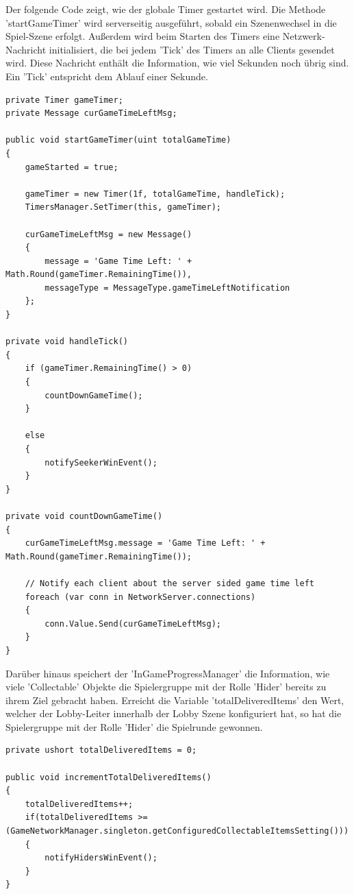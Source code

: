 Der folgende Code zeigt, wie der globale Timer gestartet wird. Die Methode 'startGameTimer' wird serverseitig ausgeführt, sobald ein Szenenwechsel in die Spiel-Szene erfolgt. Außerdem wird beim Starten des Timers eine Netzwerk-Nachricht initialisiert, die bei jedem 'Tick' des Timers an alle Clients gesendet wird. Diese Nachricht enthält die Information, wie viel Sekunden noch übrig sind. Ein 'Tick' entspricht dem Ablauf einer Sekunde.

\begin{lstlisting}[caption= InGameProgressManager.cs global Game Time Handling]
private Timer gameTimer;
private Message curGameTimeLeftMsg;

public void startGameTimer(uint totalGameTime)
{
	gameStarted = true;
	
	gameTimer = new Timer(1f, totalGameTime, handleTick);
	TimersManager.SetTimer(this, gameTimer);
	
	curGameTimeLeftMsg = new Message()
	{
		message = 'Game Time Left: ' + Math.Round(gameTimer.RemainingTime()),
		messageType = MessageType.gameTimeLeftNotification
	};
}

private void handleTick()
{
	if (gameTimer.RemainingTime() > 0)
	{
		countDownGameTime();
	}
	
	else
	{
		notifySeekerWinEvent();
	}
}

private void countDownGameTime()
{
	curGameTimeLeftMsg.message = 'Game Time Left: ' + Math.Round(gameTimer.RemainingTime());
	
	// Notify each client about the server sided game time left
	foreach (var conn in NetworkServer.connections)
	{
		conn.Value.Send(curGameTimeLeftMsg);
	}
}
\end{lstlisting}

Darüber hinaus speichert der 'InGameProgressManager' die Information, wie viele 'Collectable' Objekte die Spielergruppe mit der Rolle 'Hider' bereits zu ihrem Ziel gebracht haben. Erreicht die Variable 'totalDeliveredItems' den Wert, welcher der Lobby-Leiter innerhalb der Lobby Szene konfiguriert hat, so hat die Spielergruppe mit der Rolle 'Hider' die Spielrunde gewonnen.

\begin{lstlisting}[caption= InGameProgressManager.cs Item Devlivery Handling]
private ushort totalDeliveredItems = 0;

public void incrementTotalDeliveredItems()
{
	totalDeliveredItems++;
	if(totalDeliveredItems >= (GameNetworkManager.singleton.getConfiguredCollectableItemsSetting()))
	{
		notifyHidersWinEvent();
	}
}	
\end{lstlisting}

